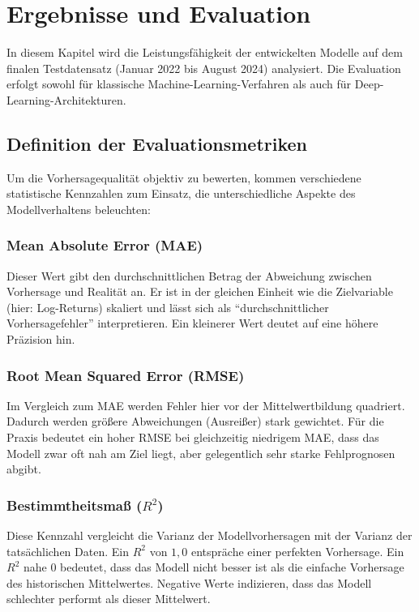\section{Ergebnisse und Evaluation}
\label{sec:ergebnisse}

In diesem Kapitel wird die Leistungsfähigkeit der entwickelten Modelle auf dem finalen Testdatensatz (Januar 2022 bis August 2024) analysiert.
Die Evaluation erfolgt sowohl für klassische Machine-Learning-Verfahren als auch für Deep-Learning-Architekturen.

\subsection{Definition der Evaluationsmetriken}

Um die Vorhersagequalität objektiv zu bewerten, kommen verschiedene statistische Kennzahlen zum Einsatz, die unterschiedliche Aspekte des Modellverhaltens beleuchten:


\subsubsection{Mean Absolute Error (MAE)}
Dieser Wert gibt den durchschnittlichen Betrag der Abweichung zwischen Vorhersage und Realität an.
Er ist in der gleichen Einheit wie die Zielvariable (hier: Log-Returns) skaliert und lässt sich als "`durchschnittlicher Vorhersagefehler"' interpretieren.
Ein kleinerer Wert deutet auf eine höhere Präzision hin.

\subsubsection{Root Mean Squared Error (RMSE)} 
Im Vergleich zum MAE werden Fehler hier vor der Mittelwertbildung quadriert.
Dadurch werden größere Abweichungen (Ausreißer) stark gewichtet.
Für die Praxis bedeutet ein hoher RMSE bei gleichzeitig niedrigem MAE, dass das Modell zwar oft nah am Ziel liegt, aber gelegentlich sehr starke Fehlprognosen abgibt.

\subsubsection{Bestimmtheitsmaß ($R^2$)} 
Diese Kennzahl vergleicht die Varianz der Modellvorhersagen mit der Varianz der tatsächlichen Daten.
Ein $R^2$ von $1,0$ entspräche einer perfekten Vorhersage.
Ein $R^2$ nahe $0$ bedeutet, dass das Modell nicht besser ist als die einfache Vorhersage des historischen Mittelwertes.
Negative Werte indizieren, dass das Modell schlechter performt als dieser Mittelwert.

